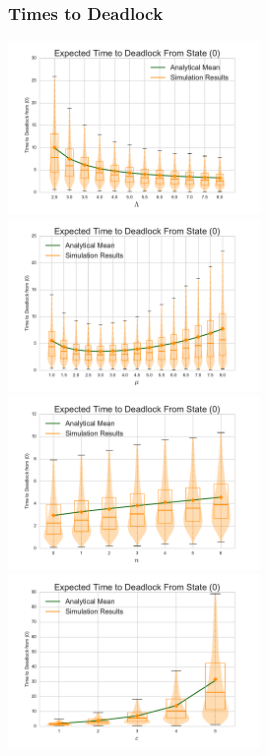 \documentclass[xcolor={table}]{beamer}
\begin{document}
\begin{frame}
    \begin{figure}
    
    \end{figure}
\end{frame}

\begin{frame}
    \frametitle{Times to Deadlock}
    \includegraphics[width=0.5\textwidth]{varyL_1Nms}
    \includegraphics[width=0.5\textwidth]{varymu_1Nms}\newline
    \includegraphics[width=0.5\textwidth]{varyn_1Nms}
    \includegraphics[width=0.5\textwidth]{varyc_1Nms}
\end{frame}
\end{document}
